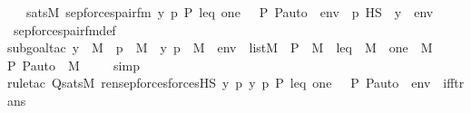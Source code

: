 \begin{isabellebody}
\ \ \ {\isachardoublequoteopen}sats{\isacharparenleft}{\kern0pt}M{\isacharcomma}{\kern0pt}\ sep{\isacharunderscore}{\kern0pt}forces{\isacharunderscore}{\kern0pt}pair{\isacharunderscore}{\kern0pt}fm{\isacharparenleft}{\kern0pt}{\isasymphi}{\isacharparenright}{\kern0pt}{\isacharcomma}{\kern0pt}\ {\isacharbrackleft}{\kern0pt}{\isacharless}{\kern0pt}y{\isacharcomma}{\kern0pt}\ p{\isachargreater}{\kern0pt}{\isacharcomma}{\kern0pt}\ P{\isacharcomma}{\kern0pt}\ leq{\isacharcomma}{\kern0pt}\ one{\isacharcomma}{\kern0pt}\ {\isacharless}{\kern0pt}{\isasymF}{\isacharcomma}{\kern0pt}\ {\isasymG}{\isacharcomma}{\kern0pt}\ P{\isacharcomma}{\kern0pt}\ P{\isacharunderscore}{\kern0pt}auto{\isachargreater}{\kern0pt}{\isacharbrackright}{\kern0pt}\ {\isacharat}{\kern0pt}\ env{\isacharparenright}{\kern0pt}\ {\isasymlongleftrightarrow}\ p\ {\isasymtturnstile}HS\ {\isasymphi}\ {\isacharbrackleft}{\kern0pt}y{\isacharbrackright}{\kern0pt}\ {\isacharat}{\kern0pt}\ env{\isachardoublequoteclose}\ \isanewline
%
\isadelimproof
\isanewline
\ \ %
\endisadelimproof
%
\isatagproof
{}\isamarkupfalse%
\ sep{\isacharunderscore}{\kern0pt}forces{\isacharunderscore}{\kern0pt}pair{\isacharunderscore}{\kern0pt}fm{\isacharunderscore}{\kern0pt}def\ \isanewline
\ \ \isamarkupfalse%
{\isacharparenleft}{\kern0pt}subgoal{\isacharunderscore}{\kern0pt}tac\ {\isachardoublequoteopen}y\ {\isasymin}\ M\ {\isasymand}\ p\ {\isasymin}\ M\ {\isasymand}\ {\isacharless}{\kern0pt}y{\isacharcomma}{\kern0pt}\ p{\isachargreater}{\kern0pt}\ {\isasymin}\ M\ {\isasymand}\ env\ {\isasymin}\ list{\isacharparenleft}{\kern0pt}M{\isacharparenright}{\kern0pt}\ {\isasymand}\ P\ {\isasymin}\ M\ {\isasymand}\ leq\ {\isasymin}\ M\ {\isasymand}\ one\ {\isasymin}\ M\ {\isasymand}\ {\isacharless}{\kern0pt}{\isasymF}{\isacharcomma}{\kern0pt}\ {\isasymG}{\isacharcomma}{\kern0pt}\ P{\isacharcomma}{\kern0pt}\ P{\isacharunderscore}{\kern0pt}auto{\isachargreater}{\kern0pt}\ {\isasymin}\ M{\isachardoublequoteclose}{\isacharparenright}{\kern0pt}\isanewline
\ \ \ \isamarkupfalse%
\ simp\isanewline
\ \ \ \isamarkupfalse%
{\isacharparenleft}{\kern0pt}rule{\isacharunderscore}{\kern0pt}tac\ Q{\isacharequal}{\kern0pt}{\isachardoublequoteopen}sats{\isacharparenleft}{\kern0pt}M{\isacharcomma}{\kern0pt}\ ren{\isacharunderscore}{\kern0pt}sep{\isacharunderscore}{\kern0pt}forces{\isacharparenleft}{\kern0pt}forcesHS{\isacharparenleft}{\kern0pt}{\isasymphi}{\isacharparenright}{\kern0pt}{\isacharparenright}{\kern0pt}{\isacharcomma}{\kern0pt}\ {\isacharbrackleft}{\kern0pt}y{\isacharcomma}{\kern0pt}\ p{\isacharcomma}{\kern0pt}\ {\isacharless}{\kern0pt}y{\isacharcomma}{\kern0pt}\ p{\isachargreater}{\kern0pt}{\isacharcomma}{\kern0pt}\ P{\isacharcomma}{\kern0pt}\ leq{\isacharcomma}{\kern0pt}\ one{\isacharcomma}{\kern0pt}\ {\isacharless}{\kern0pt}{\isasymF}{\isacharcomma}{\kern0pt}\ {\isasymG}{\isacharcomma}{\kern0pt}\ P{\isacharcomma}{\kern0pt}\ P{\isacharunderscore}{\kern0pt}auto{\isachargreater}{\kern0pt}{\isacharbrackright}{\kern0pt}\ {\isacharat}{\kern0pt}\ env{\isacharparenright}{\kern0pt}{\isachardoublequoteclose}\ \ iff{\isacharunderscore}{\kern0pt}trans{\isacharparenright}{\kern0pt}\isanewline

\end{isabellebody}
